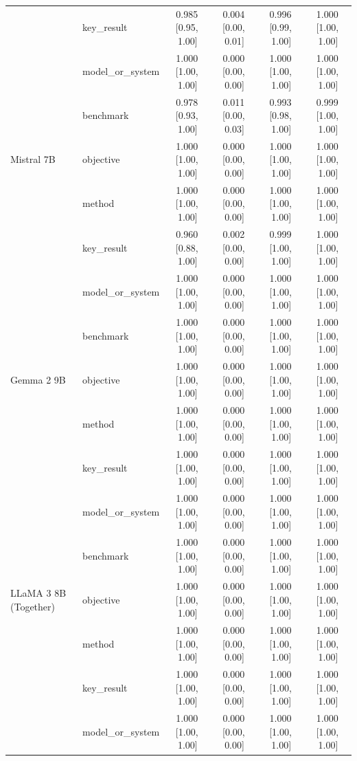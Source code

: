 \documentclass[11pt]{article}
\begin{document}
{\begin{longtable}{@{}p{3.2cm}lcccc@{}}
   & key\_result & 0.985\,[0.95,\,1.00] & 0.004\,[0.00,\,0.01] & 0.996\,[0.99,\,1.00] & 1.000\,[1.00,\,1.00] \\
   & model\_or\_system & 1.000\,[1.00,\,1.00] & 0.000\,[0.00,\,0.00] & 1.000\,[1.00,\,1.00] & 1.000\,[1.00,\,1.00] \\
   & benchmark & 0.978\,[0.93,\,1.00] & 0.011\,[0.00,\,0.03] & 0.993\,[0.98,\,1.00] & 0.999\,[1.00,\,1.00] \\
  \midrule
  Mistral 7B & objective & 1.000\,[1.00,\,1.00] & 0.000\,[0.00,\,0.00] & 1.000\,[1.00,\,1.00] & 1.000\,[1.00,\,1.00] \\
   & method & 1.000\,[1.00,\,1.00] & 0.000\,[0.00,\,0.00] & 1.000\,[1.00,\,1.00] & 1.000\,[1.00,\,1.00] \\
   & key\_result & 0.960\,[0.88,\,1.00] & 0.002\,[0.00,\,0.00] & 0.999\,[1.00,\,1.00] & 1.000\,[1.00,\,1.00] \\
   & model\_or\_system & 1.000\,[1.00,\,1.00] & 0.000\,[0.00,\,0.00] & 1.000\,[1.00,\,1.00] & 1.000\,[1.00,\,1.00] \\
   & benchmark & 1.000\,[1.00,\,1.00] & 0.000\,[0.00,\,0.00] & 1.000\,[1.00,\,1.00] & 1.000\,[1.00,\,1.00] \\
  \midrule
  Gemma 2 9B & objective & 1.000\,[1.00,\,1.00] & 0.000\,[0.00,\,0.00] & 1.000\,[1.00,\,1.00] & 1.000\,[1.00,\,1.00] \\
   & method & 1.000\,[1.00,\,1.00] & 0.000\,[0.00,\,0.00] & 1.000\,[1.00,\,1.00] & 1.000\,[1.00,\,1.00] \\
   & key\_result & 1.000\,[1.00,\,1.00] & 0.000\,[0.00,\,0.00] & 1.000\,[1.00,\,1.00] & 1.000\,[1.00,\,1.00] \\
   & model\_or\_system & 1.000\,[1.00,\,1.00] & 0.000\,[0.00,\,0.00] & 1.000\,[1.00,\,1.00] & 1.000\,[1.00,\,1.00] \\
   & benchmark & 1.000\,[1.00,\,1.00] & 0.000\,[0.00,\,0.00] & 1.000\,[1.00,\,1.00] & 1.000\,[1.00,\,1.00] \\
  \midrule
  LLaMA 3 8B (Together) & objective & 1.000\,[1.00,\,1.00] & 0.000\,[0.00,\,0.00] & 1.000\,[1.00,\,1.00] & 1.000\,[1.00,\,1.00] \\
   & method & 1.000\,[1.00,\,1.00] & 0.000\,[0.00,\,0.00] & 1.000\,[1.00,\,1.00] & 1.000\,[1.00,\,1.00] \\
   & key\_result & 1.000\,[1.00,\,1.00] & 0.000\,[0.00,\,0.00] & 1.000\,[1.00,\,1.00] & 1.000\,[1.00,\,1.00] \\
   & model\_or\_system & 1.000\,[1.00,\,1.00] & 0.000\,[0.00,\,0.00] & 1.000\,[1.00,\,1.00] & 1.000\,[1.00,\,1.00] \\

\end{longtable}}
\end{document}
